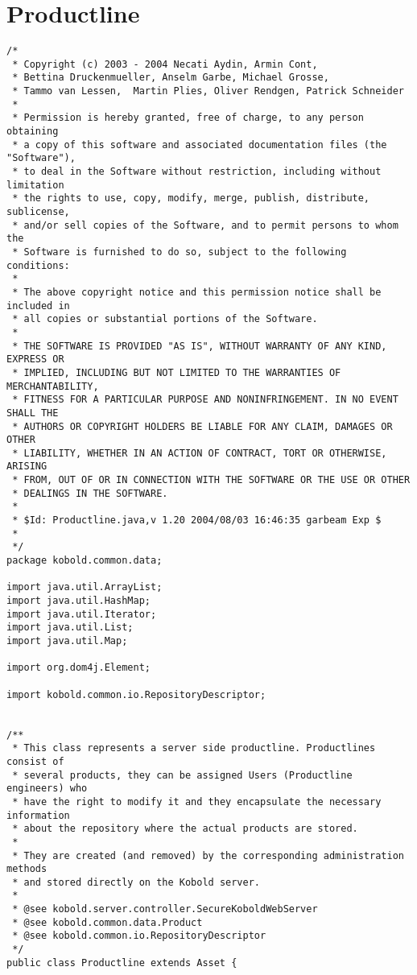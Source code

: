 \section{Productline}
\small \begin{verbatim}
/*
 * Copyright (c) 2003 - 2004 Necati Aydin, Armin Cont, 
 * Bettina Druckenmueller, Anselm Garbe, Michael Grosse, 
 * Tammo van Lessen,  Martin Plies, Oliver Rendgen, Patrick Schneider
 * 
 * Permission is hereby granted, free of charge, to any person obtaining
 * a copy of this software and associated documentation files (the "Software"),
 * to deal in the Software without restriction, including without limitation
 * the rights to use, copy, modify, merge, publish, distribute, sublicense, 
 * and/or sell copies of the Software, and to permit persons to whom the 
 * Software is furnished to do so, subject to the following conditions:
 *
 * The above copyright notice and this permission notice shall be included in 
 * all copies or substantial portions of the Software.
 *
 * THE SOFTWARE IS PROVIDED "AS IS", WITHOUT WARRANTY OF ANY KIND, EXPRESS OR 
 * IMPLIED, INCLUDING BUT NOT LIMITED TO THE WARRANTIES OF MERCHANTABILITY, 
 * FITNESS FOR A PARTICULAR PURPOSE AND NONINFRINGEMENT. IN NO EVENT SHALL THE 
 * AUTHORS OR COPYRIGHT HOLDERS BE LIABLE FOR ANY CLAIM, DAMAGES OR OTHER 
 * LIABILITY, WHETHER IN AN ACTION OF CONTRACT, TORT OR OTHERWISE, ARISING 
 * FROM, OUT OF OR IN CONNECTION WITH THE SOFTWARE OR THE USE OR OTHER 
 * DEALINGS IN THE SOFTWARE.
 *
 * $Id: Productline.java,v 1.20 2004/08/03 16:46:35 garbeam Exp $
 *
 */
package kobold.common.data;

import java.util.ArrayList;
import java.util.HashMap;
import java.util.Iterator;
import java.util.List;
import java.util.Map;

import org.dom4j.Element;

import kobold.common.io.RepositoryDescriptor;


/**
 * This class represents a server side productline. Productlines consist of
 * several products, they can be assigned Users (Productline engineers) who
 * have the right to modify it and they encapsulate the necessary information 
 * about the repository where the actual products are stored.
 * 
 * They are created (and removed) by the corresponding administration methods 
 * and stored directly on the Kobold server. 
 * 
 * @see kobold.server.controller.SecureKoboldWebServer
 * @see kobold.common.data.Product
 * @see kobold.common.io.RepositoryDescriptor 
 */
public class Productline extends Asset {


\end{verbatim}
